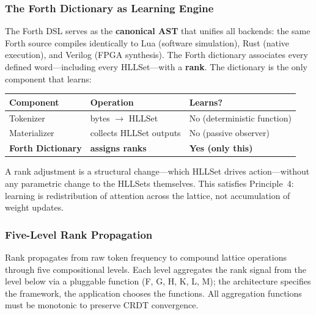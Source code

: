 \documentclass[11pt,a4paper]{article}
\theoremstyle{remark}
\begin{document}
\subsubsection{The Forth Dictionary as Learning Engine}

The Forth DSL serves as the \textbf{canonical AST} that unifies all backends: the
same Forth source compiles identically to Lua (software simulation), Rust (native
execution), and Verilog (FPGA synthesis).  The Forth dictionary associates every
defined word---including every HLLSet---with a \textbf{rank}.  The dictionary is the
only component that learns:

\begin{center}
\begin{tabular}{@{}lll@{}}
\toprule
\textbf{Component} & \textbf{Operation} & \textbf{Learns?} \\
\midrule
Tokenizer       & bytes $\to$ HLLSet           & No (deterministic function) \\
Materializer    & collects HLLSet outputs       & No (passive observer) \\
\textbf{Forth Dictionary} & \textbf{assigns ranks} & \textbf{Yes (only this)} \\
\bottomrule
\end{tabular}
\end{center}

A rank adjustment is a structural change---which HLLSet drives action---without any
parametric change to the HLLSets themselves.  This satisfies Principle~4: learning is
redistribution of attention across the lattice, not accumulation of weight updates.

\subsubsection{Five-Level Rank Propagation}

Rank propagates from raw token frequency to compound lattice operations through five
compositional levels.  Each level aggregates the rank signal from the level below via
a pluggable function (F, G, H, K, L, M); the architecture specifies the framework,
the application chooses the functions.  All aggregation functions must be monotonic
to preserve CRDT convergence.
\end{document}
